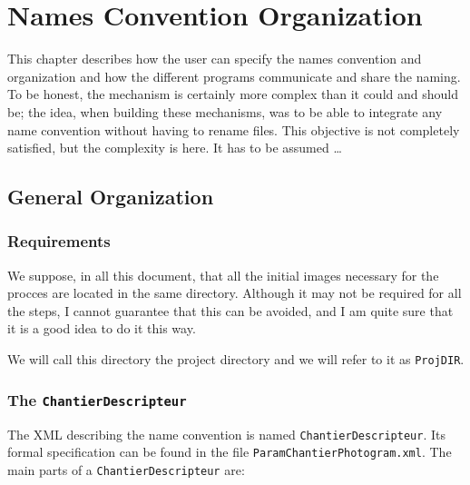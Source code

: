 \chapter{Names Convention Organization}

This chapter describes how the user can specify the names convention
and organization and how the different programs communicate
and share the naming. To be honest, the mechanism is certainly more
complex than it could and should be; the idea, when building these
mechanisms, was to be able to integrate any name convention without having
to rename files. This objective is not completely satisfied, but the
complexity is here. It has to be assumed \dots



\label{Chap:NFS}


\section{General Organization}

\subsection{Requirements}

We suppose, in all this document, that all the initial images necessary
for the procces are located in the same directory. Although it may
not be required for all the steps, I cannot guarantee that this can be avoided,
and I am quite sure that it is a good idea to do it this way.

We will call this directory the project directory and
we will refer to it as {\tt ProjDIR}.


\subsection{The  {\tt ChantierDescripteur}}

The XML  describing the name convention is named {\tt ChantierDescripteur}.
Its formal specification can be found in the file {\tt ParamChantierPhotogram.xml}.
The main parts of a {\tt ChantierDescripteur}  are:

